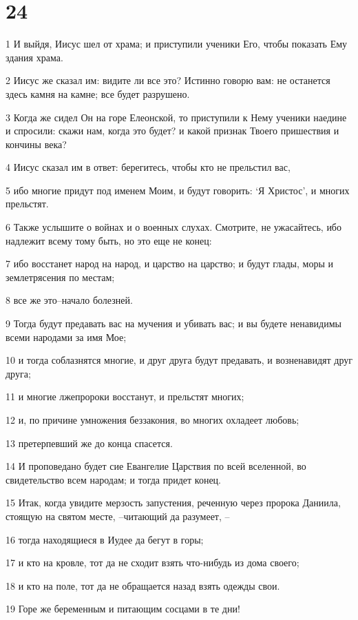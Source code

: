\chapter{24}

\par 1 И выйдя, Иисус шел от храма; и приступили ученики Его, чтобы показать Ему здания храма.
\par 2 Иисус же сказал им: видите ли все это? Истинно говорю вам: не останется здесь камня на камне; все будет разрушено.
\par 3 Когда же сидел Он на горе Елеонской, то приступили к Нему ученики наедине и спросили: скажи нам, когда это будет? и какой признак Твоего пришествия и кончины века?
\par 4 Иисус сказал им в ответ: берегитесь, чтобы кто не прельстил вас,
\par 5 ибо многие придут под именем Моим, и будут говорить: `Я Христос', и многих прельстят.
\par 6 Также услышите о войнах и о военных слухах. Смотрите, не ужасайтесь, ибо надлежит всему тому быть, но это еще не конец:
\par 7 ибо восстанет народ на народ, и царство на царство; и будут глады, моры и землетрясения по местам;
\par 8 все же это--начало болезней.
\par 9 Тогда будут предавать вас на мучения и убивать вас; и вы будете ненавидимы всеми народами за имя Мое;
\par 10 и тогда соблазнятся многие, и друг друга будут предавать, и возненавидят друг друга;
\par 11 и многие лжепророки восстанут, и прельстят многих;
\par 12 и, по причине умножения беззакония, во многих охладеет любовь;
\par 13 претерпевший же до конца спасется.
\par 14 И проповедано будет сие Евангелие Царствия по всей вселенной, во свидетельство всем народам; и тогда придет конец.
\par 15 Итак, когда увидите мерзость запустения, реченную через пророка Даниила, стоящую на святом месте, --читающий да разумеет, --
\par 16 тогда находящиеся в Иудее да бегут в горы;
\par 17 и кто на кровле, тот да не сходит взять что-нибудь из дома своего;
\par 18 и кто на поле, тот да не обращается назад взять одежды свои.
\par 19 Горе же беременным и питающим сосцами в те дни!

